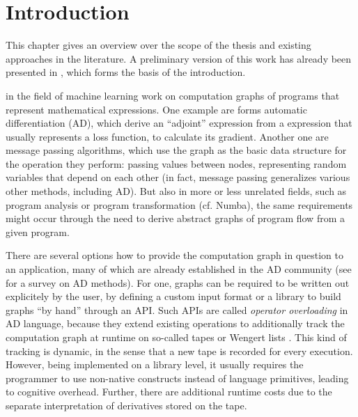 \chapter{Introduction}
\label{cha:introduction}

This chapter gives an overview over the scope of the thesis and existing approaches in the
literature.  A preliminary version of this work has already been presented in
\cite{gabler2019graph}, which forms the basis of the introduction.

 in the field of machine learning work on computation graphs of programs
that represent mathematical expressions.  One example are forms automatic differentiation (AD),
which derive an \enquote{adjoint} expression from a expression that usually represents a loss
function, to calculate its gradient.  Another one are message passing algorithms, which use the
graph as the basic data structure for the operation they perform: passing values between nodes,
representing random variables that depend on each other (in fact, message passing generalizes
various other methods, including AD).  But also in more or less unrelated fields, such as program
analysis or program transformation (cf. Numba), the same requirements might occur
through the need to derive abstract graphs of program flow from a given program.

There are several options how to provide the computation graph in question to an application, many
of which are already established in the AD community (see \cite{baydin2018automatic} for a survey on
AD methods).  For one, graphs can be required to be written out explicitely by the user, by defining
a custom input format or a library to build graphs \enquote{by hand} through an
API.  Such APIs are called \emph{operator overloading} in
AD language, because they extend existing operations to additionally track the computation graph at
runtime on so-called tapes or Wengert lists \cite{bartholomew-biggs2000automatic}.  This kind of
tracking is dynamic, in the sense that a new tape is recorded for every execution.  However, being
implemented on a library level, it usually requires the programmer to use non-native constructs
instead of language primitives, leading to cognitive overhead. Further, there are additional runtime
costs due to the separate interpretation of derivatives stored on the tape.

